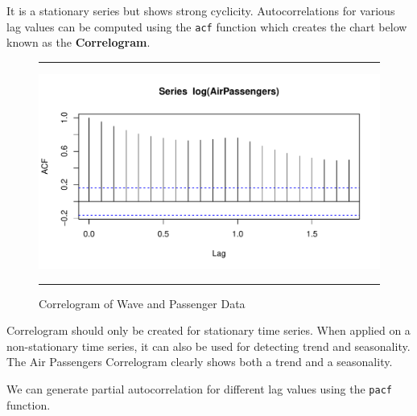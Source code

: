 \documentclass[11pt, letterpaper, twoside]{memoir}\usepackage{knitr}
\begin{document}
It is a stationary series but shows strong cyclicity. Autocorrelations for various lag values can be computed using the \texttt{acf} function which creates the chart below known as the \textbf{Correlogram}.

\begin{figure}
\centering
\rule{4in}{1pt}
\begin{knitrout}
\color{fgcolor}\begin{kframe}
\begin{alltt}
\end{alltt}


{\ttfamily\noindent\bfseries\color{errorcolor}{\#\# Error in as.ts(x): object 'wave' not found}}\begin{alltt}
\hlstd{(}
\end{alltt}
\end{kframe}
\includegraphics[width=\maxwidth]{figure/unnamed-chunk-111-1} 

\end{knitrout}
\caption{Correlogram of Wave and Passenger Data}
\label{Fig:correlogram}
\rule{4in}{1pt}
\end{figure}

Correlogram should only be created for stationary time series. When applied on a non-stationary time series, it can also be used for detecting trend and seasonality. The Air Passengers Correlogram clearly shows both a trend and a seasonality.

We can generate partial autocorrelation for different lag values using the \texttt{pacf} function.
\end{document}
